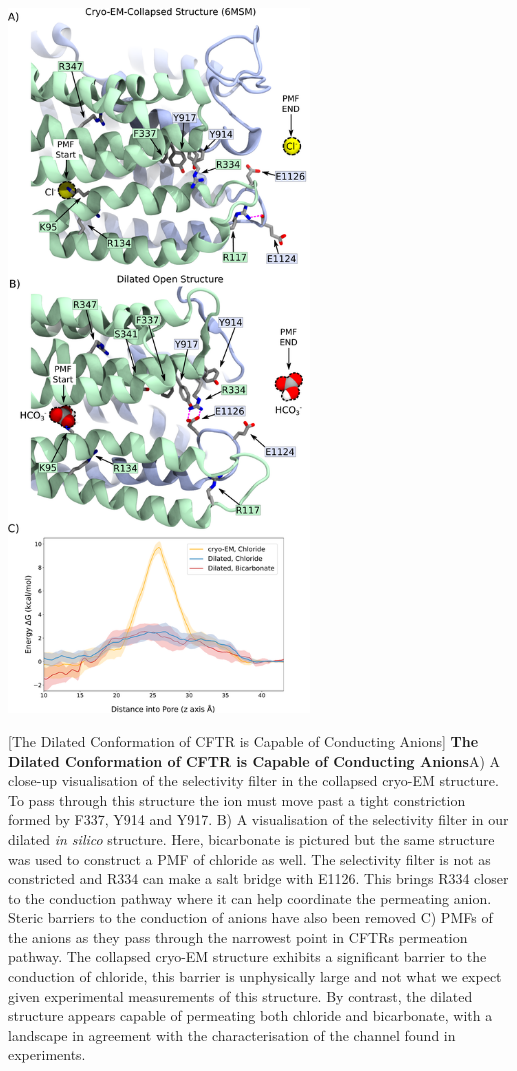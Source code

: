 	\begin{center}
		\includegraphics[width=0.6\textwidth]{figures/opening/pmf_fig_1_combined.pdf}
	\end{center}
\begingroup

	\captionsetup{singlelinecheck = false, justification=raggedright}
	[The Dilated Conformation of CFTR is Capable of Conducting Anions] {\textbf{The Dilated Conformation of CFTR is Capable of Conducting Anions}}{A) A close-up visualisation of the selectivity filter in the collapsed cryo-EM structure. To pass through this structure the ion must move past a tight constriction formed by F337, Y914 and Y917. B) A visualisation of the selectivity filter in our dilated \textit{in silico} structure. Here, bicarbonate is pictured but the same structure was used to construct a PMF of chloride as well. The selectivity filter is not as constricted and R334 can make a salt bridge with E1126. This brings R334 closer to the conduction pathway where it can help coordinate the permeating anion. Steric barriers to the conduction of anions have also been removed C) PMFs of the anions as they pass through the narrowest point in CFTRs permeation pathway. The collapsed cryo-EM structure exhibits a significant barrier to the conduction of chloride, this barrier is unphysically large and not what we expect given experimental measurements of this structure. By contrast, the dilated structure appears capable of permeating both chloride and bicarbonate, with a landscape in agreement with the characterisation of the channel found in experiments. }
	\label{US_anions}
	\endgroup



